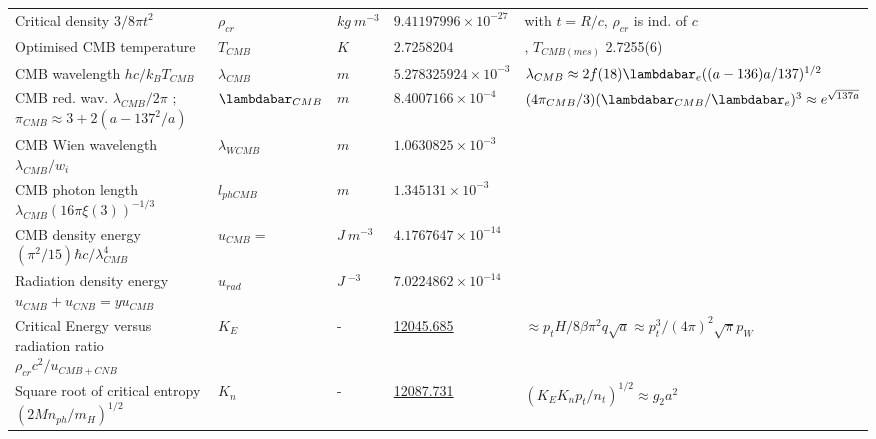 \documentclass[a4paper,9pt]{article}
\begin{document}
\begin{table}
\begin{tabular}{lllll}
 
 Critical density $3/ 8\pi t^2$ & $\rho_{cr}$  & $kg ~m^{-3}$  & $ 9.41197996 \times 10^{-27} $ & with $t = R/c$, $\rho_{cr}$ is ind. of $c$   \\ 
 
 
   Optimised CMB temperature & $T_{CMB}$ &$ K$ & $2.7258204$ & \cite{Sanchez2}, $T_{CMB(mes)} $ 2.7255(6)  \\
   
  CMB wavelength $h c/ k_B T_{CMB}$ & $\lambda_{CMB}  $ & $m$ & $5.278325924 \times 10^{-3} $ & \cite{Sanchez2}  $\lambda_{CMB} \approx 2f(18)\lambdabar_{e}((a-136)a/137)^{1/2} $\\
  
  
  
   CMB red. wav. $\lambda_{CMB}/2\pi$ ; $\pi_{CMB} \approx 3+2(a-137^2/a)$ & $\lambdabar_{CMB}  $ & $m$ & $8.4007166 \times 10^{-4} $ & $(4\pi_{CMB}/3)(\lambdabar_{CMB} /\lambdabar_e)^3 \approx e^{\sqrt{137a}}$\\
   CMB Wien wavelength $\lambda_{CMB}/w_i$ & $\lambda_{WCMB} $ &$ m$ & $1.0630825  \times 10^{-3} $ & \cite{Sanchez2} \\
   
   
   
   CMB photon length $\lambda_{CMB} (16\pi \xi(3))^{-1/3}$ & $l_{phCMB}  $ & $m$ & $1.345131  \times 10^{-3} $ & \cite{Sanchez2} \\
   
   
   CMB density energy $(\pi^2/15)\hbar c/\lambda_{CMB}^4 $& $u_{CMB} =  $ & $J~ m^{-3}$ &  $4.1767647  \times 10^{-14} $ & \cite{Sanchez2}  \\
   
   Radiation density energy $ u_{CMB}+u_{CNB}  = y u_{CMB}$ & $u_{rad}  $ & $J ~^{-3}$ &  $7.0224862  \times 10^{-14} $ & \cite{Sanchez2} \\
   
   Critical Energy versus radiation ratio $\rho_{cr} c^2/u_{CMB+CNB}$& $K_E$ & - &  \underline {12045.685} & $\approx p_t H /8\beta \pi^2q \sqrt a \approx p_t^3/(4\pi)^2 \sqrt \pi p_W$  \\
   
   Square root of critical entropy $(2Mn_{ph}/m_H)^{1/2}$ & $K_n$ &- & \underline {12087.731}  & $(K_E K_n p_t/n_t)^{1/2} \approx g_2 a^2$ \\
   

\end{tabular}
\end{table}
\end{document}
